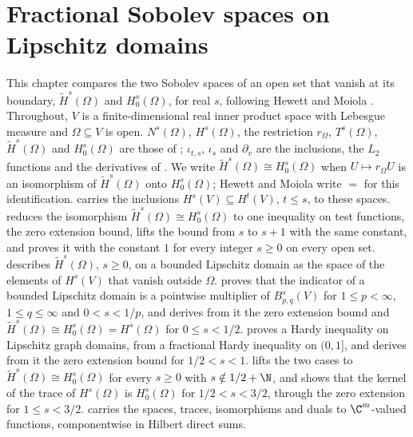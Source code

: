 
\chapter{Fractional Sobolev spaces on Lipschitz domains}
\label{ch:fractional-sobolev-domains}

This chapter compares the two Sobolev spaces of an open set that vanish at its boundary,
$\tilde H^s(\Omega)$ and $H^s_0(\Omega)$, for real $s$, following Hewett and Moiola
\cite{HewettMoiola}. Throughout, $V$ is a finite-dimensional real inner product space with
Lebesgue measure and $\Omega \subseteq V$ is open. $N^s(\Omega)$, $H^s(\Omega)$, the restriction
$r_\Omega$, $T^s(\Omega)$, $\tilde H^s(\Omega)$ and $H^s_0(\Omega)$ are those of
; $\iota_{t,s}$, $\iota_s$ and $\partial_v$ are the
inclusions, the $L_2$ functions and the derivatives of . We write
$\tilde H^s(\Omega) \cong H^s_0(\Omega)$ when $U \mapsto r_\Omega U$ is an isomorphism of
$\tilde H^s(\Omega)$ onto $H^s_0(\Omega)$; Hewett and Moiola write $=$ for this identification.
 carries the inclusions $H^s(V) \subseteq H^t(V)$, $t \leq s$,
to these spaces.  reduces the isomorphism
$\tilde H^s(\Omega) \cong H^s_0(\Omega)$ to one inequality on test functions, the zero extension
bound, lifts the bound from $s$ to $s + 1$ with the same constant, and proves it with the
constant $1$ for every integer $s \geq 0$ on every open set. 
describes $\tilde H^s(\Omega)$, $s \geq 0$, on a bounded Lipschitz domain as the space of the
elements of $H^s(V)$ that vanish outside $\Omega$.  proves that
the indicator of a bounded Lipschitz domain is a pointwise multiplier of $B^s_{p,q}(V)$ for
$1 \leq p < \infty$, $1 \leq q \leq \infty$ and $0 < s < 1/p$, and
 derives from it the zero extension bound and
$\tilde H^s(\Omega) \cong H^s_0(\Omega) = H^s(\Omega)$ for $0 \leq s < 1/2$.
 proves a Hardy inequality on Lipschitz graph domains, from a
fractional Hardy inequality on $(0, 1]$, and derives from it the zero extension bound for
$1/2 < s < 1$.  lifts the two cases to
$\tilde H^s(\Omega) \cong H^s_0(\Omega)$ for every $s \geq 0$ with $s \notin 1/2 + \N$, and
 shows that the kernel of the trace of $H^s(\Omega)$ is
$H^s_0(\Omega)$ for $1/2 < s < 3/2$, through the zero extension for $1 \leq s < 3/2$.
 carries the spaces, traces, isomorphisms and duals to $\C^m$-valued
functions, componentwise in Hilbert direct sums.

